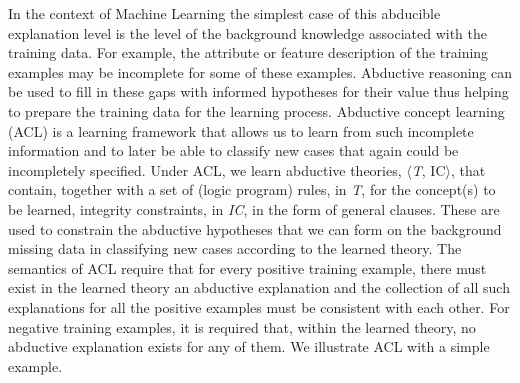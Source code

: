 In the context of Machine Learning the simplest case of this abducible explanation level is the level of the background knowledge associated with the training data. For example, the attribute or feature description of the training examples may be incomplete for some of these examples. Abductive reasoning can be used to fill in these gaps with informed hypotheses for their value thus helping to prepare the training data for the learning process.
Abductive concept learning (ACL)  is a learning framework that allows us to learn from such incomplete information and to later be able to classify new cases that again could be incompletely specified. Under ACL, we learn abductive theories, $\langle$\textit{T}, IC$\rangle$, that contain, together with a set of (logic program) rules, in \textit{T}, for the concept(s) to be learned, integrity constraints, in \textit{IC}, in the form of general clauses. These are used to constrain the abductive hypotheses that we can form on the background missing data in classifying new cases according to the learned theory.
The semantics of ACL require that for every positive training example, there must exist in the learned theory an abductive explanation and the collection of all such explanations for all the positive examples must be consistent with each other. For negative training examples, it is required that, within the learned theory, no abductive explanation exists for any of them. We illustrate ACL with a simple example.
